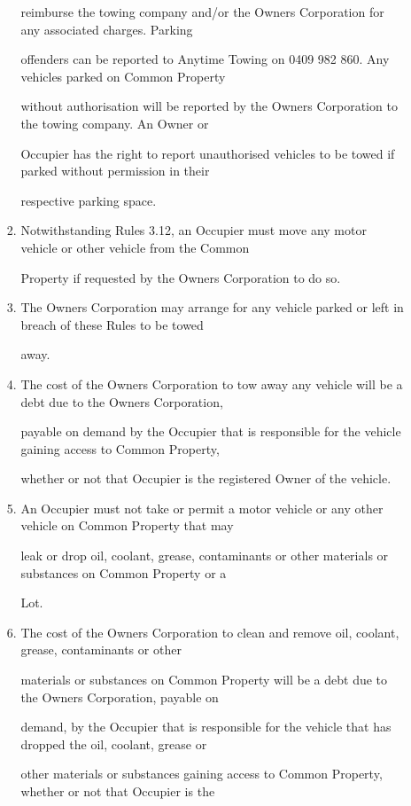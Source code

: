 \documentclass{article}
\begin{document}
\begin{enumerate}[label=\arabic*.]
\begin{enumerate}[label=\arabic{enumi}.\arabic*.]
\begin{enumerate}[label=(\arabic*)]
reimburse the towing company and/or the Owners Corporation for any associated charges. Parking 

offenders can be reported to Anytime Towing on 0409 982 860. Any vehicles parked on Common Property 

without authorisation will be reported by the Owners Corporation to the towing company. An Owner or 

Occupier has the right to report unauthorised vehicles to be towed if parked without permission in their 

respective parking space. 

\item  Notwithstanding Rules 3.12, an Occupier must move any motor vehicle or other vehicle from the Common 

Property if requested by the Owners Corporation to do so. 

\item  The Owners Corporation may arrange for any vehicle parked or left in breach of these Rules to be towed 

away. 

\newpage

\item  The cost of the Owners Corporation to tow away any vehicle will be a debt due to the Owners Corporation, 

payable on demand by the Occupier that is responsible for the vehicle gaining access to Common Property, 

whether or not that Occupier is the registered Owner of the vehicle. 

\item  An Occupier must not take or permit a motor vehicle or any other vehicle on Common Property that may 

leak or drop oil, coolant, grease, contaminants or other materials or substances on Common Property or a 

Lot. 

\item  The cost of the Owners Corporation to clean and remove oil, coolant, grease, contaminants or other 

materials or substances on Common Property will be a debt due to the Owners Corporation, payable on 

demand, by the Occupier that is responsible for the vehicle that has dropped the oil, coolant, grease or 

other materials or substances gaining access to Common Property, whether or not that Occupier is the 


\end{enumerate}
\end{enumerate}
\end{enumerate}
\end{document}
